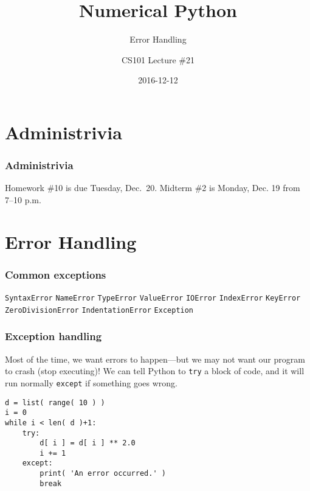 \documentclass[11pt]{beamer}
\title{Numerical Python}
\subtitle{Error Handling}
\author{CS101 Lecture \#21}
\date{2016-12-12}
\begin{document}
  \setcounter{showProgressBar}{0}
  \setcounter{showSlideNumbers}{0}

\frame{\titlepage}

\setcounter{framenumber}{0}
\setcounter{showProgressBar}{1}
\setcounter{showSlideNumbers}{1}

\section{Administrivia}

\begin{frame}
  \frametitle{Administrivia}
  \Enlarge

   \begin{itemize}
   	\myitem  Homework \#10 is due Tuesday, Dec.\ 20.
   	\myitem  Midterm \#2 is Monday, Dec. 19 from 7–10 p.m.
   \end{itemize}
\end{frame}


\section{Error Handling}

\begin{frame}[fragile]
  \frametitle{Common exceptions}
  \Enlarge

  \begin{enumerate}
  \myitem  \texttt{SyntaxError}
  \myitem  \texttt{NameError}
  \myitem  \texttt{TypeError}
  \myitem  \texttt{ValueError}
  \myitem  \texttt{IOError}
  \myitem  \texttt{IndexError}
  \myitem  \texttt{KeyError}
  \myitem  \texttt{ZeroDivisionError}
  \myitem  \texttt{IndentationError}
  \myitem  \texttt{Exception}
  \end{enumerate}
\end{frame}

\begin{frame}[fragile]
  \frametitle{Exception handling}
  \Enlarge

  \begin{enumerate}
  \myitem  Most of the time, we want errors to happen---but we may not want our program to crash (stop executing)! \pause
  \myitem  We can tell Python to \texttt{try} a block of code, and it will run normally \texttt{except} if something goes wrong. \pause
  \end{enumerate}
  \begin{Verbatim}
d = list( range( 10 ) )
i = 0
while i < len( d )+1:
    try:
        d[ i ] = d[ i ] ** 2.0
        i += 1
    except:
        print( 'An error occurred.' )
        break
  \end{Verbatim}
\end{frame}
\end{document}
